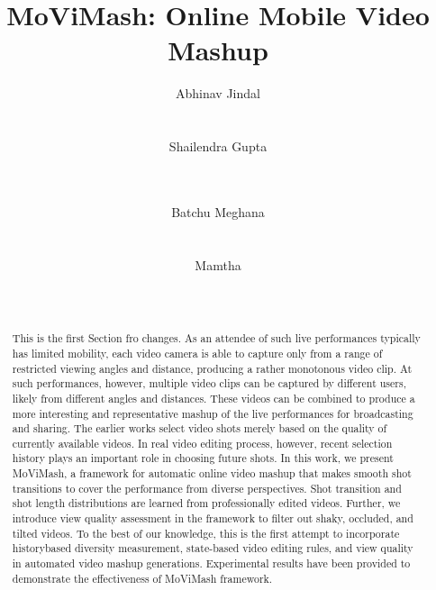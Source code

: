 \documentclass{sig-alternate}
\begin{document}
\title{MoViMash: Online Mobile Video Mashup}


\author{
\alignauthor Abhinav Jindal\\
       \\
       \\
\alignauthor Shailendra Gupta\\
       \\
       \\
\and  
\alignauthor Batchu Meghana\\
       \\
       \\
\alignauthor Mamtha \\
       \\
       \\
}

\maketitle
\begin{abstract}
This is the first Section fro changes. As an attendee of such live
performances typically has limited mobility, each video camera is
able to capture only from a range of restricted viewing angles and
distance, producing a rather monotonous video clip. At such performances,
however, multiple video clips can be captured by different
users, likely from different angles and distances. These videos
can be combined to produce a more interesting and representative
mashup of the live performances for broadcasting and sharing. The
earlier works select video shots merely based on the quality of currently
available videos. In real video editing process, however, recent
selection history plays an important role in choosing future
shots. In this work, we present MoViMash, a framework for automatic
online video mashup that makes smooth shot transitions to
cover the performance from diverse perspectives. Shot transition
and shot length distributions are learned from professionally edited
videos. Further, we introduce view quality assessment in the framework
to filter out shaky, occluded, and tilted videos. To the best
of our knowledge, this is the first attempt to incorporate historybased
diversity measurement, state-based video editing rules, and
view quality in automated video mashup generations. Experimental
results have been provided to demonstrate the effectiveness of
MoViMash framework.\\
\\	
\\
\end{abstract}
\end{document}
